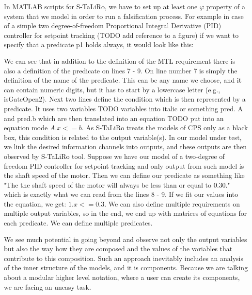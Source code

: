 In MATLAB scripts for S-TaLiRo, we have to set up at least one $\varphi$ property of a system that we model in order to run a falsification process. For example in case of a simple two degree-of-freedom Proportional Integral Derivative (PID) controller for setpoint tracking (TODO add reference to a figure) if we want to specify that a predicate p1 holds always, it would look like this:




We can see that in addition to the definition of the MTL requirement there is also a definition of the predicate on lines 7 - 9. On line number 7 is simply the definition of the name of the predicate. This can be any name we choose, and it can contain numeric digits, but it has to start by a lowercase letter (e.g., isGateOpen2). Next two lines define the condition which is then represented by a predicate. It uses two variables TODO variables into italic or something pred. A and pred.b which are then translated into an equation TODO put into an equation mode $A.x <= b$. As S-TaLiRo treats the models of CPS only as a black box, this condition is related to the output variable(s). In our model under test, we link the desired information channels into outputs, and these outputs are then observed by S-TaLiRo tool. Suppose we have our model of a two-degree of freedom PID controller for setpoint tracking and only output from such model is the shaft speed of the motor. Then we can define our predicate as something like "The the shaft speed of the motor will always be less than or equal to 0.30." which is exactly what we can read from the lines 8 - 9. If we fit our values into the equation, we get: $1.x <= 0.3$. We can also define multiple requirements on multiple output variables, so in the end, we end up with matrices of equations for each predicate. We can define multiple predicates.

We see much potential in going beyond and observe not only the output variables but also the way how they are composed and the values of the variables that contribute to this composition. Such an approach inevitably includes an analysis of the inner structure of the models, and it is components. Because we are talking about a modular higher level notation, where a user can create its components, we are facing an uneasy task. 
